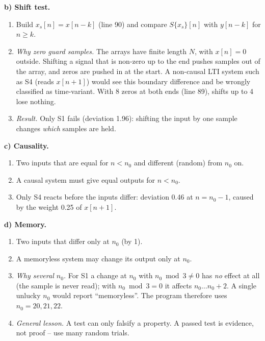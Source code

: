 \begin{solution}
\textbf{b) Shift test.}
\begin{enumerate}[label=Step \arabic*:,leftmargin=*,itemsep=1pt]
  \item Build $x_s[n]=x[n-k]$ (line 90) and compare $S\{x_s\}[n]$ with
    $y[n-k]$ for $n\ge k$.
  \item \emph{Why zero guard samples.} The arrays have finite length $N$, with
    $x[n]=0$ outside. Shifting a signal that is non-zero up to the end pushes
    samples out of the array, and zeros are pushed in at the start. A
    non-causal LTI system such as S4 (reads $x[n+1]$) would see this boundary
    difference and be wrongly classified as time-variant. With 8 zeros at both
    ends (line 89), shifts up to 4 lose nothing.
  \item \emph{Result.} Only S1 fails (deviation 1.96): shifting the input by
    one sample changes \emph{which} samples are held.
\end{enumerate}

\textbf{c) Causality.}
\begin{enumerate}[label=Step \arabic*:,leftmargin=*,itemsep=1pt]
  \item Two inputs that are equal for $n<n_0$ and different (random) from $n_0$ on.
  \item A causal system must give equal outputs for $n<n_0$.
  \item Only S4 reacts before the inputs differ: deviation 0.46 at
    $n=n_0-1$, caused by the weight 0.25 of $x[n+1]$.
\end{enumerate}

\textbf{d) Memory.}
\begin{enumerate}[label=Step \arabic*:,leftmargin=*,itemsep=1pt]
  \item Two inputs that differ only at $n_0$ (by 1).
  \item A memoryless system may change its output only at $n_0$.
  \item \emph{Why several $n_0$.} For S1 a change at $n_0$ with
    $n_0\bmod3\neq0$ has \emph{no} effect at all (the sample is never read);
    with $n_0\bmod3=0$ it affects $n_0\dots n_0+2$. A single unlucky $n_0$
    would report ``memoryless''. The program therefore uses $n_0=20,21,22$.
  \item \emph{General lesson.} A test can only falsify a property. A passed test
    is evidence, not proof -- use many random trials.
\end{enumerate}


\end{solution}
